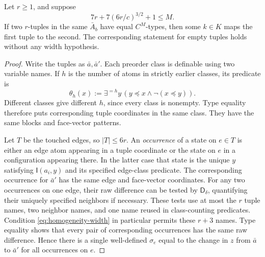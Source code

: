 \begin{proposition}
\label{prop:base-homogeneity}
Let \(r\ge1\), and suppose
\begin{equation}
\label{eq:homogeneity-width}
 7r+7(6r/c)^{3/2}+1\le M.
\end{equation}
If two \(r\)-tuples in the same \(\bar A_b\) have equal \(C^M\)-types, then
some \(k\in K\) maps the first tuple to the second.  The corresponding
statement for empty tuples holds without any width hypothesis.
\end{proposition}
\begin{proof}
Write the tuples as \(\bar a,\bar a'\).  Each preorder class is definable
using two variable names.  If \(h\) is the number of atoms in strictly
earlier classes, its predicate is
\[
 \theta_h(x):=\exists^{=h}y\,
       (y\preceq x\land\neg(x\preceq y)).
\]
Different classes give different \(h\), since every class is nonempty.
Type equality therefore puts corresponding tuple coordinates in the same
class.  They have the same blocks and face-vector patterns.

Let \(T\) be the touched edges, so \(|T|\le6r\).  An \emph{occurrence} of a
state on \(e\in T\) is either an edge atom appearing in a tuple coordinate
or the state on \(e\) in a configuration appearing there.  In the latter
case that state is the unique \(y\) satisfying \(\mathsf I(a_i,y)\) and its
specified edge-class predicate.  The corresponding occurrence for
\(\bar a'\) has the same edge and face-vector coordinates.  For any two
occurrences on one edge, their raw difference can be tested by
\(\mathsf D_\delta\), quantifying their uniquely specified neighbors if
necessary.  These tests use at most the \(r\) tuple names, two neighbor
names, and one name reused in class-counting predicates.  Condition
\eqref{eq:homogeneity-width} in particular permits these \(r+3\) names.
Type equality shows that every pair of corresponding occurrences has the
same raw difference.  Hence there is a single well-defined
\(\sigma_e\) equal to the change in \(z\) from \(\bar a\) to \(\bar a'\)
for all occurrences on \(e\).


\end{proof}
